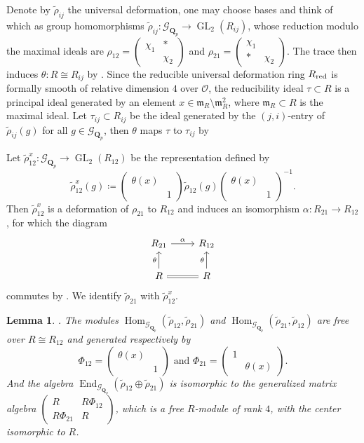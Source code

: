 \documentclass[leqno]{amsart}
\newcommand{\smat}[1]{\left( \begin{smallmatrix} #1 \end{smallmatrix} \right)}
\newcommand{\Gp}{\mathcal{G}_{\Qp}} %
\newcommand{\red}{\textnormal{red}}
\DeclareMathOperator{\GL}{GL}
\newcommand{\Qp}{\mathbf{Q}_p}
\newcommand{\oo}{\mathcal{O}} %
\newcommand{\fm}{\mathfrak{m}}
\DeclareMathOperator{\End}{End}
\DeclareMathOperator{\Hom}{Hom}
\newtheorem{lem}[thm]{Lemma}
\theoremstyle{definition}
\theoremstyle{remark}
\begin{document}
Denote by $\tilde{\rho}_{ij}$ the universal deformation,
one may choose bases and think of which as group homomorphisms
$\tilde{\rho}_{ij}\colon \Gp\to \GL_2(R_{ij})$,
whose reduction modulo the maximal ideals are
$\rho_{12}=\smat{\chi_1&*\\&\chi_2}$ and
$\rho_{21}=\smat{\chi_1&\\ * &\chi_2}$.
The trace then induces 
$\theta\colon R\cong R_{ij}$
by \cite[Prop B.17]{pask}.
Since the reducible universal deformation ring
$R_{\red}$ is formally smooth of 
relative dimension $4$ over $\oo$,
the reducibility ideal  $\tau\subset R$ 
is a principal ideal generated by 
an element $x\in\fm_R\setminus \fm_R^2$,
where $\fm_R\subset R$ is the maximal ideal. 
Let $\tau_{ij}\subset R_{ij} $ be the ideal 
generated by the $(j,i)$-entry of  $ \tilde{\rho}_{ij}(g)$
for all $g\in \Gp$,
then  $\theta$ maps  
$\tau$ to  $\tau_{ij}$ by \cite[Prop B.23]{pask}

Let $\tilde{\rho}_{12}^x\colon \Gp\to \GL_2(R_{12})$ be the representation defined by
\begin{equation*}
	\tilde{\rho}_{12}^x(g)\coloneqq 
	\smat{\theta(x)&\\&1}
	\tilde{\rho}_{12}(g)
	\smat{\theta(x)&\\&1}^{-1}.
\end{equation*}
Then $\tilde{\rho}_{12}^x$
is a deformation of $\rho_{21}$ to $R_{12}$
and induces an isomorphism 
$\alpha\colon R_{21}\to R_{12}$,
for which the diagram
\begin{equation*}
	\begin{tikzcd}
		R_{21} \arrow[r,"\alpha"] &
		R_{12}\\
		R\arrow[u,"\theta"] \arrow[r,equal] &
		R\arrow[u,"\theta"]
	\end{tikzcd}
\end{equation*}
commutes by \cite[Prop B.24]{pask}.
We identify $\tilde{\rho}_{21}$ with 
$\tilde{\rho}_{12}^x$.

\begin{lem}\cite[Prop B.26]{pask}.
The modules
$\Hom_{\Gp}(\tilde{\rho}_{12}, \tilde{\rho}_{21})$ and
$\Hom_{\Gp}(\tilde{\rho}_{21}, \tilde{\rho}_{12})$
are free over $R\cong R_{12}$ and
generated respectively by
\begin{equation}\label{eq:Phi_ij}
	\Phi_{12}=\smat{\theta(x)&\\&1} \text{ and }
	\Phi_{21}=\smat{1&\\&\theta(x)}.
\end{equation}
And the algebra
$\End_{\Gp}(\tilde{\rho}_{12}\oplus \tilde{\rho}_{21})$
is isomorphic to the generalized matrix algebra
$\smat{R& R\Phi_{12}\\ R\Phi_{21}& R}$,
which is a free $R$-module of rank  $4$,
with the center isomorphic to  $R$.
\end{lem}
\end{document}
